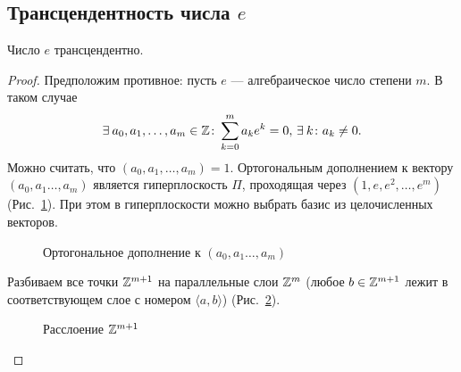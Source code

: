 \subsection{\texorpdfstring{Трансцендентность числа $e$}{Трансцендентность числа e}}
\label{subsec:III-3}

\begin{ntheorem}
    Число $e$ трансцендентно.
\end{ntheorem}
\begin{proof}
    Предположим противное: пусть $e$ --- алгебраическое число степени $m$. В таком случае
    \[
        \exists a_0, a_1, \dots, a_m \in \ZZ\colon \sum_{k=0}^m a_ke^k = 0,\, \exists k\colon a_k \ne 0.
    \]
    Можно считать, что $\left( a_0, a_1, \dots, a_m \right) = 1$. Ортогональным дополнением к вектору ${\left( a_0, a_1 \dots, a_m \right)}$ является гиперплоскость $\Pi$, проходящая через $\left( 1, e, e^2, \dots, e^m \right)$ (Рис.~\ref{fg:IV-1}). При этом в гиперплоскости можно выбрать базис из целочисленных векторов.
    \begin{figure}[h]
        \centering
        
        \caption{Ортогональное дополнение к $\left( a_0, a_1 \dots, a_m \right)$}
        \label{fg:IV-1}
    \end{figure}

    Разбиваем все точки $\mathbb{Z}^{m+1}$ на параллельные слои $\mathbb{Z}^m$ (любое $b \in \mathbb{Z}^{m+1}$ лежит в соответствующем слое с номером $\langle a, b \rangle$) (Рис.~\ref{fg:IV-2}).
    
    \begin{figure}[!ht]
        \centering
        
        \caption{Расслоение $\mathbb{Z}^{m+1}$}
        \label{fg:IV-2}
    \end{figure}
    

\end{proof}
